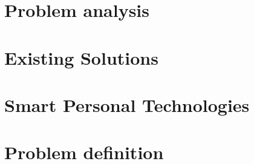 \chapter{Problem analysis}
 

\chapter{Existing Solutions}
 \label{preliminaries:existingsolutions}

%


\chapter{Smart Personal Technologies}


\chapter{Problem definition}

